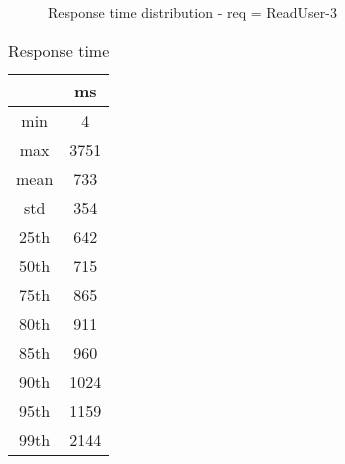 \begin{minipage}{0.75\linewidth}
\begin{figure}[h]
\begin{adjustbox}{max width=1.0\linewidth, keepaspectratio}
  \end{adjustbox}
  \caption{Response time distribution - req = ReadUser-3}
\end{figure}
\end{minipage}\hfill\begin{minipage}{0.18\linewidth}
\begin{table}[h]
\begin{tabular}{|cc|}
\hline
\textbf{} & \textbf{ms}\\ \hline
 \Xhline{0.005\arrayrulewidth}
min & 4\\
 \Xhline{0.005\arrayrulewidth}
max & 3751\\
 \Xhline{0.005\arrayrulewidth}
mean & 733\\
 \Xhline{0.005\arrayrulewidth}
std & 354\\
\hline
\hline
 \Xhline{0.005\arrayrulewidth}
25th & 642\\
 \Xhline{0.005\arrayrulewidth}
50th & 715\\
 \Xhline{0.005\arrayrulewidth}
75th & 865\\
 \Xhline{0.005\arrayrulewidth}
80th & 911\\
 \Xhline{0.005\arrayrulewidth}
85th & 960\\
 \Xhline{0.005\arrayrulewidth}
90th & 1024\\
 \Xhline{0.005\arrayrulewidth}
95th & 1159\\
 \Xhline{0.005\arrayrulewidth}
99th & 2144\\
\hline
\end{tabular}
\caption{Response time}
\end{table}
\end{minipage}\hfill